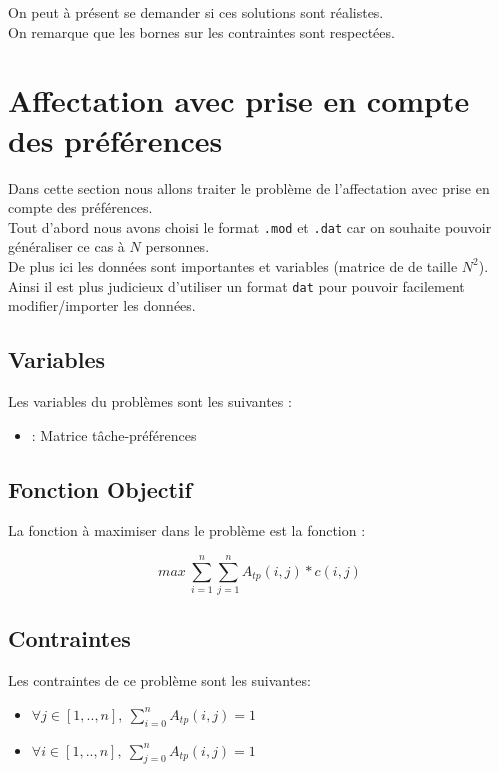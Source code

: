 On peut à présent se demander si ces solutions sont réalistes.
\\ On remarque que les bornes sur les contraintes sont respectées.


\section{Affectation avec prise en compte des préférences}
Dans cette section nous allons traiter le problème de l'affectation avec prise en compte des préférences.\\
Tout d'abord nous avons choisi le format \texttt{.mod} et \texttt{.dat} car on souhaite pouvoir généraliser ce cas à $N$ personnes.\\
De plus ici les données sont importantes et variables (matrice de de taille $N^2$). \\
Ainsi il est plus judicieux d'utiliser un format \texttt{dat} pour pouvoir facilement modifier/importer les données.

\subsection{Variables}
Les variables du problèmes sont les suivantes : \newline

\begin{itemize}

\item {} : Matrice tâche-préférences \newline

\end{itemize}

\subsection{Fonction Objectif}
La fonction à maximiser dans le problème est la fonction :

$$max\ \sum_{i=1}^{n}\sum\limits_{j=1}^{n}A_{tp}(i,j)*c(i,j)$$

\subsection{Contraintes}
Les contraintes de ce problème sont les suivantes:

\begin{itemize}

\item $\forall j \in [1,..,n],\ \sum\limits_{i=0}^{n}A_{tp}(i,j) = 1$
\item $\forall i \in [1,..,n],\ \sum\limits_{j=0}^{n}A_{tp}(i,j) = 1$

\end{itemize}


